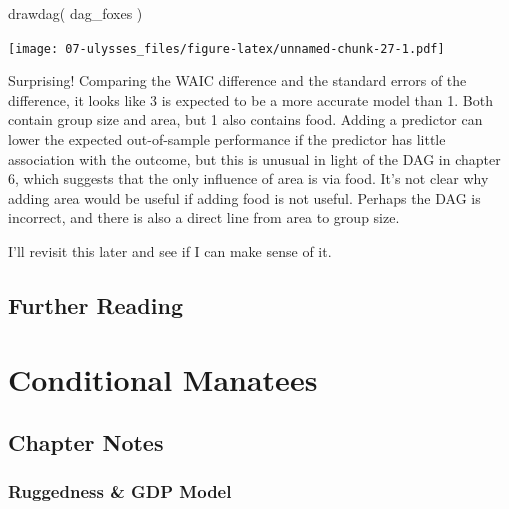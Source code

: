 \documentclass[
]{book}
\newenvironment{Shaded}{\begin{snugshade}}{\end{snugshade}}
\newcommand{\FunctionTok}[1]{\textcolor[rgb]{0.00,0.00,0.00}{#1}}
\newcommand{\NormalTok}[1]{#1}
\begin{document}
\begin{Shaded}
\begin{Highlighting}[]
\FunctionTok{drawdag}\NormalTok{( dag\_foxes )}
\end{Highlighting}
\end{Shaded}

\texttt{[image: 07-ulysses\_files/figure-latex/unnamed-chunk-27-1.pdf]}

Surprising! Comparing the WAIC difference and the standard errors of the difference, it looks like 3 is expected to be a more accurate model than 1. Both contain group size and area, but 1 also contains food. Adding a predictor can lower the expected out-of-sample performance if the predictor has little association with the outcome, but this is unusual in light of the DAG in chapter 6, which suggests that the only influence of area is via food. It's not clear why adding area would be useful if adding food is not useful. Perhaps the DAG is incorrect, and there is also a direct line from area to group size.

I'll revisit this later and see if I can make sense of it.

\hypertarget{further-reading-6}{%
\section*{Further Reading}\label{further-reading-6}}

\hypertarget{conditional}{%
\chapter{Conditional Manatees}\label{conditional}}

\hypertarget{chapter-notes-7}{%
\section{Chapter Notes}\label{chapter-notes-7}}

\hypertarget{ruggedness-gdp-model}{%
\subsection*{Ruggedness \& GDP Model}\label{ruggedness-gdp-model}}
\end{document}
